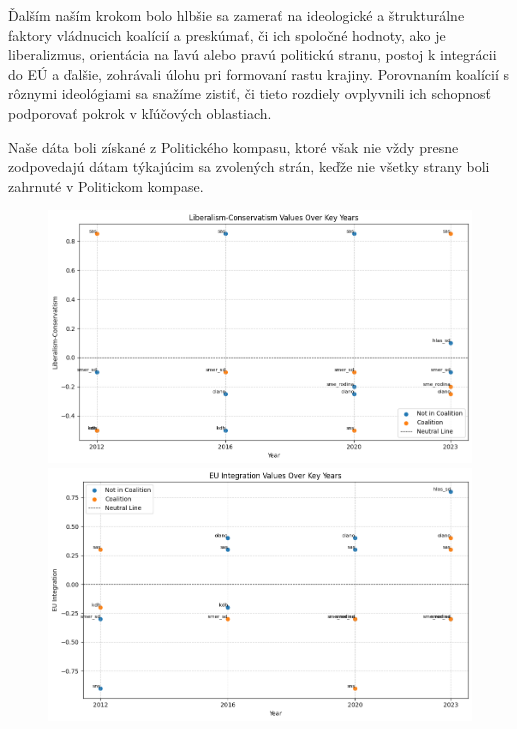 \documentclass[main.tex]{subfiles}
\begin{document}
\newpage

Ďalším naším krokom bolo hlbšie sa zamerať na ideologické a štrukturálne faktory vládnucich koalícií a preskúmať, či ich spoločné hodnoty, ako je liberalizmus, orientácia na ľavú alebo pravú politickú stranu, postoj k integrácii do EÚ a ďalšie, zohrávali úlohu pri formovaní rastu krajiny. Porovnaním koalícií s rôznymi ideológiami sa snažíme zistiť, či tieto rozdiely ovplyvnili ich schopnosť podporovať pokrok v kľúčových oblastiach. 

Naše dáta boli získané z Politického kompasu, ktoré však nie vždy presne zodpovedajú dátam týkajúcim sa zvolených strán, keďže nie všetky strany boli zahrnuté v Politickom kompase.


\begin{figure}[!htbp]
    \centering
    \includegraphics[width=\textwidth]
    {images_exploratory/Liberalism-Conservatism.png}
    \caption{}

    \centering
    \includegraphics[width=\textwidth]
    {images_exploratory/EU-Intergration.png}
    \caption{}
\end{figure}
\end{document}

